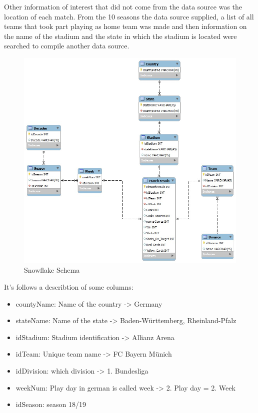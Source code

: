 \documentclass[11pt, journal]{IEEEtran}
\begin{document}
Other information of interest that did not come from the data source was the location of each match. From the 10 seasons the data source supplied,
a list of all teams that took part playing as home team was made and then information on the name of the stadium and the state in which the stadium
is located were searched to compile another data source.
\begin{figure}[htb]
	\centering
		\includegraphics[width=1.0\columnwidth]{images/Snowflake}
	\caption{Snowflake Schema}
	\label{fig:probov}
\end{figure}
%
It’s follows a describtion of some columns:
\begin{itemize}
  \item countyName: Name of the country -> Germany
  \item stateName: Name of the state -> Baden-Württemberg, Rheinland-Pfalz
  \item idStadium: Stadium identification -> Allianz Arena
  \item idTeam: Unique team name -> FC Bayern Münich 
  \item idDivision: which division -> 1. Bundesliga
  \item weekNum: Play day in german is called week -> 2. Play day = 2. Week 
  \item idSeason: season 18/19 
\end{itemize}
\end{document}

